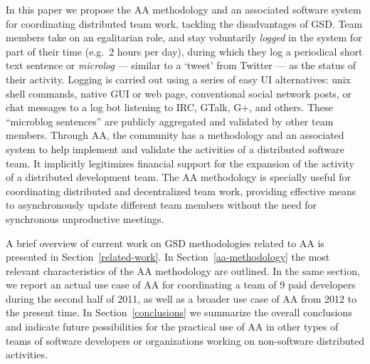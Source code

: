 \documentclass{article}
\newcommand{\indraftnote}[1]{}
\newcommand{\todo}[1]{\indraftnote{todo: #1}}
\begin{document}
In this paper we propose the AA methodology and an associated software system
for coordinating distributed team work, tackling the disadvantages
of GSD. Team members take on an egalitarian role, and stay
voluntarily \textit{logged} in the system for part of their time
(e.g.\ 2 hours per day), during which they log a periodical short text
sentence or \emph{microlog} --- similar to a `tweet' from Twitter --- as the
status of their activity. Logging is carried out using a series of
easy UI alternatives: unix shell
commands, native GUI or web page, conventional social network posts, or chat messages to a log bot
listening to IRC, GTalk, G+, and others.  These ``microblog sentences'' are
publicly aggregated and validated by other team members. Through AA, the
community has a
methodology and an associated system to help
implement and validate the activities of a distributed software team. It implicitly
legitimizes financial support for the expansion of the activity of a
distributed development team. The AA methodology is specially useful for
coordinating distributed and decentralized team work, providing effective means
to asynchronously update different team members without the need for synchronous
unproductive meetings.


A brief overview of current work on GSD methodologies related to AA is presented
in Section~\ref{related-work}. In Section~\ref{aa-methodology} the most relevant
characteristics of the AA methodology are outlined. In the same section, we
report an actual use case of AA for coordinating a team of 9 paid developers 
during the second half of 2011, as well as a broader use case of AA from 2012 to
the present time.  In Section~\ref{conclusions} we summarize the overall conclusions
and indicate future possibilities for the practical use of AA in other types of
teams of software developers or organizations working on non-software distributed
activities.

\indraftnote{
A very good article on the value of asynchronous communication for personal
and group productivity, related to the key necessity of having moments of
introversion to avoid daily pressures of forced socialization. The way we work
on the digital age enables people to be very productive, the article also
mentions linux as a hallmark example~\cite{Thompson:Wired:2012}
}
\end{document}
